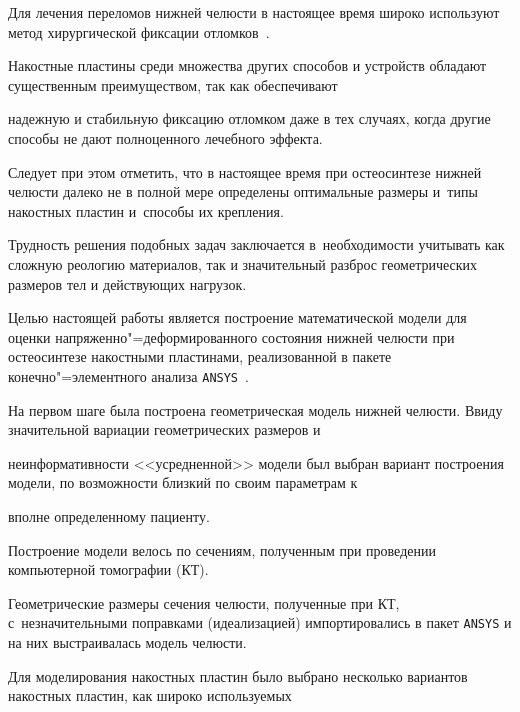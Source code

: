 


\maketitle



\small



Для лечения переломов нижней челюсти в настоящее время широко используют метод хирургической фиксации отломков~\cite{log11:bib1}.

Накостные пластины среди множества других способов и устройств обладают существенным преимуществом, так как обеспечивают

надежную и стабильную фиксацию отломком даже в тех случаях, когда другие способы не дают полноценного лечебного эффекта. 

Следует при этом отметить, что в настоящее время при остеосинтезе нижней челюсти далеко не в полной мере определены оптимальные размеры и~типы накостных пластин и~способы их крепления. 

Трудность решения подобных задач заключается в~необходимости учитывать как сложную реологию материалов, так и значительный разброс геометрических размеров тел и действующих нагрузок.

Целью настоящей работы является построение математической модели для оценки напряженно"=деформированного состояния нижней челюсти при остеосинтезе накостными пластинами, реализованной в пакете конечно"=элементного анализа {\tt ANSYS}~\cite{log11:bib2}.



На первом шаге была построена геометрическая модель нижней челюсти. Ввиду значительной вариации геометрических размеров и

неинформативности <<усредненной>> модели был выбран вариант построения модели, по возможности близкий по своим параметрам к

вполне определенному пациенту.



Построение модели велось по сечениям, полученным при проведении компьютерной томографии (КТ). 

Геометрические размеры сечения челюсти, полученные при КТ, с~незначительными поправками (идеализацией) импортировались в пакет {\tt ANSYS} и на них выстраивалась модель челюсти. 

Для моделирования накостных пластин было выбрано несколько вариантов накостных пластин, как широко используемых

